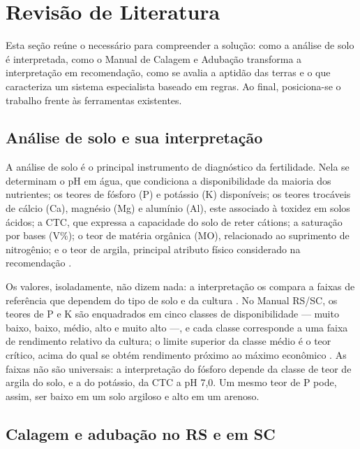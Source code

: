 \section{Revisão de Literatura}\label{sec:revisao}

Esta seção reúne o necessário para compreender a solução: como a análise de solo é
interpretada, como o Manual de Calagem e Adubação transforma a interpretação em recomendação,
como se avalia a aptidão das terras e o que caracteriza um sistema especialista baseado em
regras. Ao final, posiciona-se o trabalho frente às ferramentas existentes.

\subsection{Análise de solo e sua interpretação}\label{sec:rev_analise}

A análise de solo é o principal instrumento de diagnóstico da fertilidade. Nela se determinam
o pH em água, que condiciona a disponibilidade da maioria dos nutrientes; os teores de fósforo
(P) e potássio (K) disponíveis; os teores trocáveis de cálcio (Ca), magnésio (Mg) e alumínio
(Al), este associado à toxidez em solos ácidos; a CTC, que expressa a capacidade do solo de
reter cátions; a saturação por bases (V\%); o teor de matéria orgânica (MO), relacionado ao
suprimento de nitrogênio; e o teor de argila, principal atributo físico considerado na
recomendação \citep{Donagema2011, ManualCalagem2016}.

Os valores, isoladamente, não dizem nada: a interpretação os compara a faixas de referência
que dependem do tipo de solo e da cultura \citep{EmbrapaDoc206}. No Manual RS/SC, os teores de
P e K são enquadrados em cinco classes de disponibilidade --- muito baixo, baixo, médio, alto
e muito alto ---, e cada classe corresponde a uma faixa de rendimento relativo da cultura; o
limite superior da classe médio é o teor crítico, acima do qual se obtém rendimento próximo
ao máximo econômico \citep{ManualCalagem2016}. As faixas não são universais: a interpretação
do fósforo depende da classe de teor de argila do solo, e a do potássio, da CTC a pH 7,0. Um
mesmo teor de P pode, assim, ser baixo em um solo argiloso e alto em um arenoso.

\subsection{Calagem e adubação no RS e em SC}\label{sec:rev_manual}

